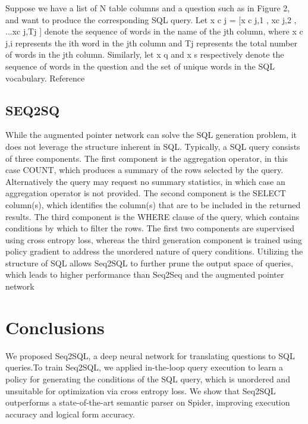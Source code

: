 \documentclass{article}
\begin{document}
Suppose we have a list of N table columns and a question such as in Figure 2, and want to produce
the corresponding SQL query. Let x
c
j = [x
c
j,1
, xc
j,2
, ...xc
j,Tj
] denote the sequence of words in the
name of the jth column, where x
c
j,i represents the ith word in the jth column and Tj represents the
total number of words in the jth column. Similarly, let x
q
and x
s
respectively denote the sequence
of words in the question and the set of unique words in the SQL vocabulary. Reference~\cite{zhong2017seq2sql}

\subsection{ SEQ2SQ}


While the augmented pointer network can
solve the SQL generation problem, it does
not leverage the structure inherent in SQL.
Typically, a SQL query consists of three components.
The first component is the aggregation operator, in this case COUNT, which produces a summary of the rows selected by
the query. Alternatively the query may request no summary statistics, in which case
an aggregation operator is not provided.
The second component is the SELECT
column(s), which
identifies the column(s) that are to be included in the returned results. The third
component is the WHERE clause of the query,
which contains conditions by which to filter the rows. The first two components
are supervised using cross entropy loss, whereas the third generation component is trained using
policy gradient to address the unordered nature of query conditions. Utilizing the structure of SQL allows Seq2SQL to further prune
the output space of queries, which leads to higher performance than Seq2Seq and the augmented
pointer network


\section{Conclusions}

We proposed Seq2SQL, a deep neural network for translating questions to SQL queries.To train Seq2SQL,
we applied in-the-loop query execution to learn a policy for generating the conditions of the SQL
query, which is unordered and unsuitable for optimization via cross entropy loss. We show that Seq2SQL outperforms a state-of-the-art semantic parser
on Spider, improving execution accuracy and logical form accuracy.




\end{document}
